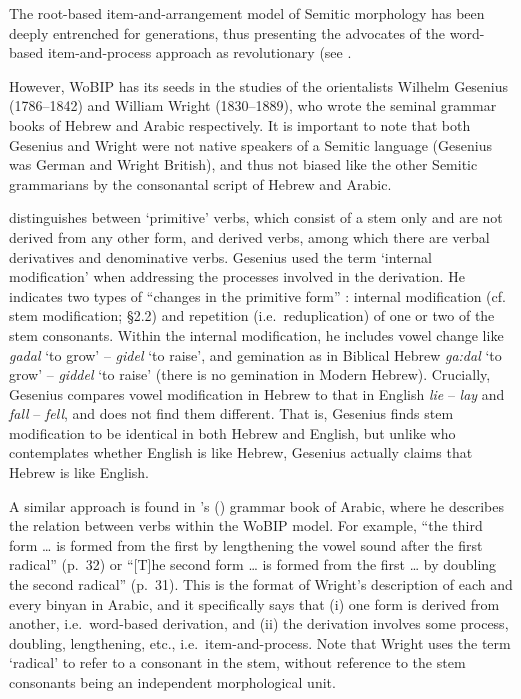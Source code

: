 \documentclass[output=paper,
modfonts
]{LSP/langsci}
\begin{document}
The root-based item-and-arrangement model of Semitic morphology has been
deeply entrenched for generations, thus presenting the advocates of the
word-based item-and-process approach as revolutionary (see \citealt{horvath1981a, lederman1982a, heath1987a, hammond1988a, mccarthy1990a, Batel1994, batel2002a, batel2003a, ratcliffe1997a, Ussishkin1999, Ussishkin2000, Ussishkin2005, laks2011a, laks2015a, lev2016}.

However, WoBIP has its seeds in the studies of the orientalists Wilhelm
Gesenius (1786--1842) and William Wright (1830--1889), who wrote the
seminal grammar books of Hebrew and Arabic respectively. It is important
to note that both Gesenius and Wright were not native speakers of a
Semitic language (Gesenius was German and Wright British), and thus not
biased like the other Semitic grammarians by the consonantal script of
Hebrew and Arabic.

\citet{gesenius1813a} distinguishes between `primitive' verbs, which
consist of a stem only and are not derived from any other form, and
derived verbs, among which there are verbal derivatives and denominative
verbs. Gesenius used the term `internal modification' when addressing
the processes involved in the derivation. He indicates two types of
``changes in the primitive form'' \citep[115]{gesenius1813a}: internal modification (cf.
stem modification; §2.2) and repetition (i.e.\ reduplication) of one or
two of the stem consonants. Within the internal modification, he
includes vowel change like \emph{gadal} `to grow' -- \emph{gidel} `to
raise', and gemination as in Biblical Hebrew \emph{ga:dal} `to grow' --
\emph{giddel} `to raise' (there is no gemination in Modern Hebrew).
Crucially, Gesenius compares vowel modification in Hebrew to that in
English \emph{lie} -- \emph{lay} and \emph{fall} -- \emph{fell}, and
does not find them different. That is, Gesenius finds stem modification
to be identical in both Hebrew and English, but unlike \citet{anderson1992}
who contemplates whether English is like Hebrew, Gesenius actually
claims that Hebrew is like English.

A similar approach is found in \citeauthor{wright1859a}'s (\citeyear{wright1859a}) grammar book of
Arabic, where he describes the relation between verbs within the WoBIP
model. For example, ``the third form \ldots{} is formed from the first
by lengthening the vowel sound after the first radical'' (p.\ 32) or
``{[}T{]}he second form \ldots{} is formed from the first \ldots{} by
doubling the second radical'' (p.\ 31). This is the format of Wright's
description of each and every binyan in Arabic, and it specifically says
that (i) one form is derived from another, i.e.\ word-based derivation,
and (ii) the derivation involves some process, doubling, lengthening,
etc., i.e.\ item-and-process. Note that Wright uses the term `radical' to
refer to a consonant in the stem, without reference to the stem
consonants being an independent morphological unit.
\end{document}
